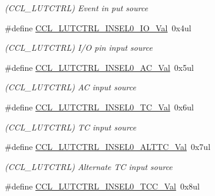 \begin{DoxyCompactItemize}
\begin{DoxyCompactList}\small\item\em (C\+C\+L\+\_\+\+L\+U\+T\+C\+T\+R\+L) Event in put source \end{DoxyCompactList}\item 
\hypertarget{group___s_a_m_l21___c_c_l_gaec398330a7a9b4476e0223c902ddd0fa}{}\#define \hyperlink{group___s_a_m_l21___c_c_l_gaec398330a7a9b4476e0223c902ddd0fa}{C\+C\+L\+\_\+\+L\+U\+T\+C\+T\+R\+L\+\_\+\+I\+N\+S\+E\+L0\+\_\+\+I\+O\+\_\+\+Val}~0x4ul\label{group___s_a_m_l21___c_c_l_gaec398330a7a9b4476e0223c902ddd0fa}

\begin{DoxyCompactList}\small\item\em (C\+C\+L\+\_\+\+L\+U\+T\+C\+T\+R\+L) I/\+O pin input source \end{DoxyCompactList}\item 
\hypertarget{group___s_a_m_l21___c_c_l_ga6b0b5f0f5cc7959cdb36fada583b7c83}{}\#define \hyperlink{group___s_a_m_l21___c_c_l_ga6b0b5f0f5cc7959cdb36fada583b7c83}{C\+C\+L\+\_\+\+L\+U\+T\+C\+T\+R\+L\+\_\+\+I\+N\+S\+E\+L0\+\_\+\+A\+C\+\_\+\+Val}~0x5ul\label{group___s_a_m_l21___c_c_l_ga6b0b5f0f5cc7959cdb36fada583b7c83}

\begin{DoxyCompactList}\small\item\em (C\+C\+L\+\_\+\+L\+U\+T\+C\+T\+R\+L) A\+C input source \end{DoxyCompactList}\item 
\hypertarget{group___s_a_m_l21___c_c_l_ga8cb43425ea1200a431b3086d58e218da}{}\#define \hyperlink{group___s_a_m_l21___c_c_l_ga8cb43425ea1200a431b3086d58e218da}{C\+C\+L\+\_\+\+L\+U\+T\+C\+T\+R\+L\+\_\+\+I\+N\+S\+E\+L0\+\_\+\+T\+C\+\_\+\+Val}~0x6ul\label{group___s_a_m_l21___c_c_l_ga8cb43425ea1200a431b3086d58e218da}

\begin{DoxyCompactList}\small\item\em (C\+C\+L\+\_\+\+L\+U\+T\+C\+T\+R\+L) T\+C input source \end{DoxyCompactList}\item 
\hypertarget{group___s_a_m_l21___c_c_l_ga98b064aa8877e7ce77ecb683353fd5d8}{}\#define \hyperlink{group___s_a_m_l21___c_c_l_ga98b064aa8877e7ce77ecb683353fd5d8}{C\+C\+L\+\_\+\+L\+U\+T\+C\+T\+R\+L\+\_\+\+I\+N\+S\+E\+L0\+\_\+\+A\+L\+T\+T\+C\+\_\+\+Val}~0x7ul\label{group___s_a_m_l21___c_c_l_ga98b064aa8877e7ce77ecb683353fd5d8}

\begin{DoxyCompactList}\small\item\em (C\+C\+L\+\_\+\+L\+U\+T\+C\+T\+R\+L) Alternate T\+C input source \end{DoxyCompactList}\item 
\hypertarget{group___s_a_m_l21___c_c_l_ga39755754ab8b792d03a3cf330e481fa1}{}\#define \hyperlink{group___s_a_m_l21___c_c_l_ga39755754ab8b792d03a3cf330e481fa1}{C\+C\+L\+\_\+\+L\+U\+T\+C\+T\+R\+L\+\_\+\+I\+N\+S\+E\+L0\+\_\+\+T\+C\+C\+\_\+\+Val}~0x8ul\label{group___s_a_m_l21___c_c_l_ga39755754ab8b792d03a3cf330e481fa1}


\end{DoxyCompactItemize}
